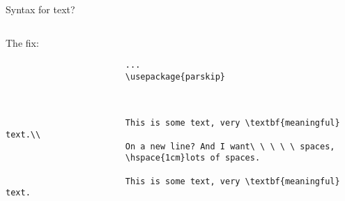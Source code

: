 \begin{frame}[fragile]{Syntax for text?}
    \begin{columns}
        \begin{column}{0.8\textwidth}

            The fix:

            \bigskip
            \begin{adjustbox}{frame=1pt 5pt,valign=t}%
                \begin{minipage}{\textwidth}%
                    \begin{verbatim} 
                        ...
                        \usepackage{parskip}

                        
                        
                        This is some text, very \textbf{meaningful} text.\\
                        On a new line? And I want\ \ \ \ \ spaces,
                        \hspace{1cm}lots of spaces.

                        This is some text, very \textbf{meaningful} text.
                        
                    \end{verbatim}
                \end{minipage}
            \end{adjustbox}
        \end{column}
    \end{columns}
\end{frame}